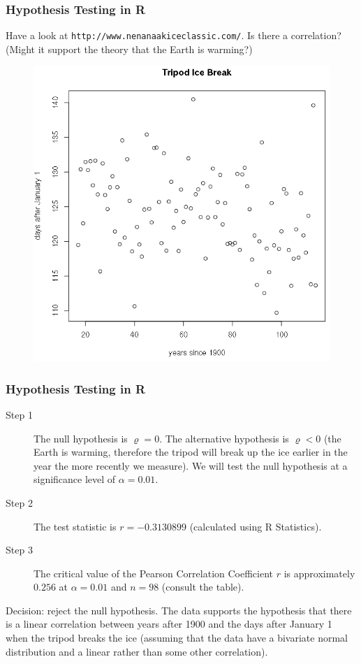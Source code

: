 \documentclass[xcolor=dvipsnames]{beamer}
\begin{document}
\begin{frame}
  \frametitle{Hypothesis Testing in R}
   Have a look at
  \texttt{http://www.nenanaakiceclassic.com/}. Is there a correlation?
  (Might it support the theory that the Earth is warming?)
  \begin{figure}[h]
    \includegraphics[scale=0.28]{./diagrams/nenana-01.png}
  \end{figure}
\end{frame}

\begin{frame}
  \frametitle{Hypothesis Testing in R}
  \begin{description}
  \item[Step 1] The null hypothesis is $\varrho=0$. The alternative
    hypothesis is $\varrho<0$ (the Earth is warming, therefore the
    tripod will break up the ice earlier in the year the more recently
    we measure). We will test the null hypothesis at a significance
    level of $\alpha=0.01$.
  \item[Step 2] The test statistic is $r=-0.3130899$ (calculated using
    R Statistics).
  \item[Step 3] The critical value of the Pearson Correlation
    Coefficient $r$ is approximately $0.256$ at $\alpha=0.01$ and
    $n=98$ (consult the table).
  \end{description}
  Decision: reject the null hypothesis. The data supports the
  hypothesis that there is a linear correlation between years after
  1900 and the days after January 1 when the tripod breaks the ice
  (assuming that the data have a bivariate normal distribution and a
  linear rather than some other correlation). 
\end{frame}
\end{document}
